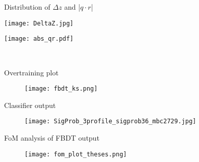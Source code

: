 \documentclass[12pt]{beamer}
\begin{document}
\begin{frame}{Distribution of $\Delta z$ and |$q\cdot r$|}                                                                           
	\begin{minipage}[t]{0.45\textwidth}
		\centering
		\texttt{[image: DeltaZ.jpg]}
	  \end{minipage}\hfill
	  \begin{minipage}[t]{0.45\textwidth}
		\centering
		\texttt{[image: abs\_qr.pdf]}
	  \end{minipage}\\[1em]
\end{frame}

\begin{frame}{Overtraining plot}                                                                           
    \begin{figure}
        \centering
        \texttt{[image: fbdt\_ks.png]}
    \end{figure}
\end{frame}

\begin{frame}{Classifier output}                                                                           
    \begin{figure}
        \centering
        \texttt{[image: SigProb\_3profile\_sigprob36\_mbc2729.jpg]}
    \end{figure}
\end{frame}

\begin{frame}{FoM analysis of FBDT output}                                                                           
    \begin{figure}
        \centering
        \texttt{[image: fom\_plot\_theses.png]}
    \end{figure}
\end{frame}
\end{document}
